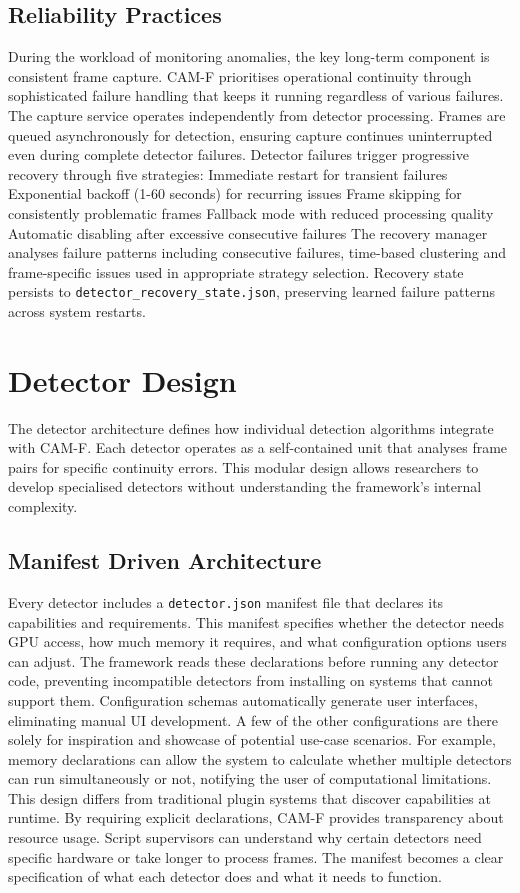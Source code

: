 \subsection{Reliability Practices}
During the workload of monitoring anomalies, the key long-term component is consistent frame capture. CAM-F prioritises operational continuity through sophisticated failure handling that keeps it running regardless of various failures. The capture service operates independently from detector processing. Frames are queued asynchronously for detection, ensuring capture continues uninterrupted even during complete detector failures. Detector failures trigger progressive recovery through five strategies:
Immediate restart for transient failures
Exponential backoff (1-60 seconds) for recurring issues
Frame skipping for consistently problematic frames
Fallback mode with reduced processing quality
Automatic disabling after excessive consecutive failures
The recovery manager analyses failure patterns including consecutive failures, time-based clustering and frame-specific issues used in appropriate strategy selection. Recovery state persists to \texttt{detector\_recovery\_state.json}, preserving learned failure patterns across system restarts.
\section{Detector Design}
The detector architecture defines how individual detection algorithms integrate with CAM-F. Each detector operates as a self-contained unit that analyses frame pairs for specific continuity errors. This modular design allows researchers to develop specialised detectors without understanding the framework's internal complexity.
\subsection{Manifest Driven Architecture}
Every detector includes a \texttt{detector.json} manifest file that declares its capabilities and requirements. This manifest specifies whether the detector needs GPU access, how much memory it requires, and what configuration options users can adjust. The framework reads these declarations before running any detector code, preventing incompatible detectors from installing on systems that cannot support them. Configuration schemas automatically generate user interfaces, eliminating manual UI development. A few of the other configurations are there solely for inspiration and showcase of potential use-case scenarios. For example, memory declarations can allow the system to calculate whether multiple detectors can run simultaneously or not, notifying the user of computational limitations.
This design differs from traditional plugin systems that discover capabilities at runtime. By requiring explicit declarations, CAM-F provides transparency about resource usage. Script supervisors can understand why certain detectors need specific hardware or take longer to process frames. The manifest becomes a clear specification of what each detector does and what it needs to function.
